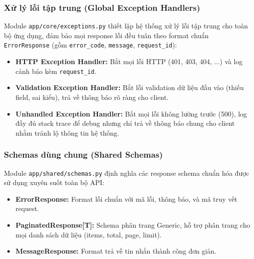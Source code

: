 \documentclass[a4paper,12pt]{article}
\begin{document}
\subsubsection{Xử lý lỗi tập trung (Global Exception Handlers)}

Module \texttt{app/core/exceptions.py} thiết lập hệ thống xử lý lỗi tập trung cho toàn bộ ứng dụng, đảm bảo mọi response lỗi đều tuân theo format chuẩn \texttt{ErrorResponse} (gồm \texttt{error\_code}, \texttt{message}, \texttt{request\_id}):

\begin{itemize}
    \item \textbf{HTTP Exception Handler:} Bắt mọi lỗi HTTP (401, 403, 404, ...) và log cảnh báo kèm \texttt{request\_id}.
    \item \textbf{Validation Exception Handler:} Bắt lỗi validation dữ liệu đầu vào (thiếu field, sai kiểu), trả về thông báo rõ ràng cho client.
    \item \textbf{Unhandled Exception Handler:} Bắt mọi lỗi không lường trước (500), log đầy đủ stack trace để debug nhưng chỉ trả về thông báo chung cho client nhằm tránh lộ thông tin hệ thống.
\end{itemize}

\subsubsection{Schemas dùng chung (Shared Schemas)}

Module \texttt{app/shared/schemas.py} định nghĩa các response schema chuẩn hóa được sử dụng xuyên suốt toàn bộ API:

\begin{itemize}
    \item \textbf{ErrorResponse:} Format lỗi chuẩn với mã lỗi, thông báo, và mã truy vết request.
    \item \textbf{PaginatedResponse[T]:} Schema phân trang Generic, hỗ trợ phân trang cho mọi danh sách dữ liệu (items, total, page, limit).
    \item \textbf{MessageResponse:} Format trả về tin nhắn thành công đơn giản.
\end{itemize}

\end{document}

